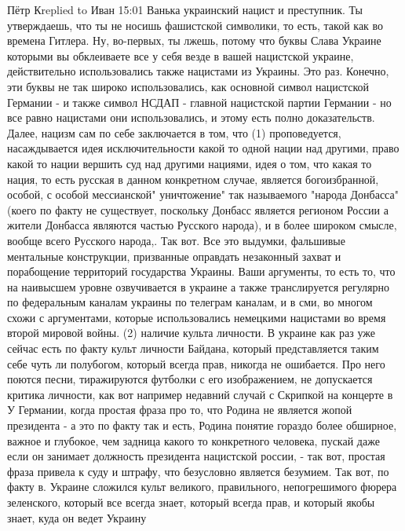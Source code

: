  
 
 
 
 

Пётр Кreplied to Иван
15:01
Ванька украинский нацист и преступник. Ты утверждаешь, что ты не носишь фашистской
символики, то есть, такой как во времена Гитлера. Ну, во-первых, ты лжешь,
потому что буквы Слава Украине которыми вы обклеиваете все у себя везде в
вашей нацистской украине, действительно использовались также нацистами из
Украины. Это раз. Конечно, эти буквы не так широко использовались, как основной
символ нацистской Германии - и также символ НСДАП - главной нацистской
партии Германии - но все равно нацистами они использовались, и этому есть полно
доказательств. Далее, нацизм сам по себе заключается в том, что (1) проповедуется,
насаждывается идея исключительности какой то одной нации над другими, право какой то
нации вершить суд над другими нациями, идея о том, что какая то нация, то есть
русская в данном конкретном случае, является богоизбранной, особой, с особой
мессианской" уничтожение" так называемого "народа
Донбасса"(коего по факту не существует, поскольку Донбасс является регионом
России а жители Донбасса являются частью Русского народа), и в более
широком смысле, вообще всего Русского народа,. Так вот. Все это выдумки, фальшивые ментальные конструкции,
призванные оправдать незаконный захват и порабощение территорий
государства Украины. Ваши аргументы, то есть то, что на наивысшем
уровне озвучивается в украине а также транслируется регулярно по федеральным
каналам украины по телеграм каналам, и в сми, во многом схожи с аргументами, которые
использовались немецкими нацистами во время второй мировой войны. (2) наличие культа
личности. В украине как раз уже сейчас есть по факту культ личности Байдана, который
представляется таким себе чуть ли полубогом, который всегда прав, никогда не
ошибается. Про него поются песни, тиражируются футболки с его изображением, не
допускается критика личности, как вот например недавний случай с Скрипкой
на концерте в У
Германии, когда простая фраза про то, что Родина не является жопой
президента - а это по факту так и есть, Родина понятие гораздо более обширное,
важное и глубокое, чем задница какого то конкретного человека, пускай даже если
он занимает должность президента нацистской россии, - так вот, простая фраза
привела к суду и штрафу, что безусловно является безумием. Так вот, по факту в.
Украине сложился культ великого, правильного, непогрешимого фюрера зеленского,
который все всегда знает, который всегда прав, и который якобы знает, куда он ведет
Украину
